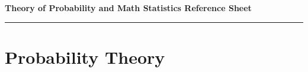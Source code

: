 \documentclass[10pt,landscape,a4paper]{article}
\newcommand{\header}{\begin{center}
		\textbf{Theory of Probability and Math Statistics Reference Sheet}
	\end{center}}
\begin{document}
	\let\displaystyle\textstyle
	\small
	\begin{multicols*}{5}
		\header
		\hrule
		\section{Probability Theory}
		
		
		
		
		
		
		
		
		
	\end{multicols*}
	
\end{document}
